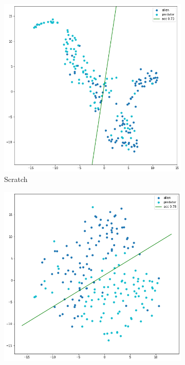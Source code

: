 \documentclass[11pt]{article}
\begin{document}
\begin{figure}[h!]
     \centering
     \begin{subfigure}[b]{0.49\textwidth}
         \centering
         \includegraphics[width=\textwidth]{img/3_tsne_scratch}
         \caption{Scratch}
     \end{subfigure}
     \hfill
     \begin{subfigure}[b]{0.49\textwidth}
         \centering
         \includegraphics[width=\textwidth]{img/3_tsne_extractor}

\end{subfigure}
\end{figure}
\end{document}
